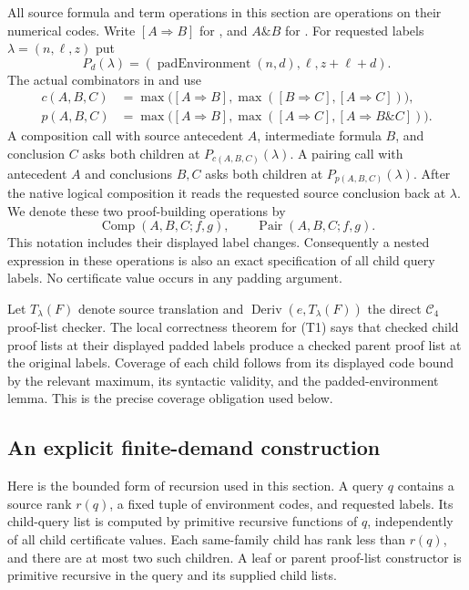 All source formula and term operations in this section are operations on
their numerical codes.  Write $[A\Rightarrow B]$ for
, and $A\mathbin{\&}B$ for .
For requested labels $\lambda=(n,\ell,z)$ put
\[
 P_d(\lambda)=
 (\operatorname{padEnvironment}(n,d),\ell,z+\ell+d).
\]
The actual combinators in
 and
 use
\begin{align*}
 c(A,B,C)&=\max\bigl([A\Rightarrow B],
               \max([B\Rightarrow C],[A\Rightarrow C])\bigr),\\
 p(A,B,C)&=\max\bigl([A\Rightarrow B],
               \max([A\Rightarrow C],[A\Rightarrow B\mathbin{\&}C])\bigr).
\end{align*}
A composition call with source antecedent $A$, intermediate formula $B$,
and conclusion $C$ asks both children at $P_{c(A,B,C)}(\lambda)$.
A pairing call with antecedent $A$ and conclusions $B,C$ asks both
children at $P_{p(A,B,C)}(\lambda)$.  After the native logical
composition it reads the requested source conclusion back at $\lambda$.
We denote these two proof-building operations by
\[
 \operatorname{Comp}(A,B,C;f,g),\qquad
 \operatorname{Pair}(A,B,C;f,g).
 \tag{T1}
\]
This notation includes their displayed label changes.  Consequently a
nested expression in these operations is also an exact specification of
all child query labels.  No certificate value occurs in any padding
argument.

Let $T_\lambda(F)$ denote source translation and
$\operatorname{Deriv}(e,T_\lambda(F))$ the direct $\mathcal C_4$
proof-list checker.  The local correctness theorem for (T1) says that
checked child proof lists at their displayed padded labels produce a
checked parent proof list at the original labels.  Coverage of each
child follows from its displayed code bound by the relevant maximum,
its syntactic validity, and the padded-environment lemma.  This is the
precise coverage obligation used below.

\subsection{An explicit finite-demand construction}

Here is the bounded form of recursion used in this section.  A query
$q$ contains a source rank $r(q)$, a fixed tuple of environment codes,
and requested labels.  Its child-query list is computed by primitive
recursive functions of $q$, independently of all child certificate
values.  Each same-family child has rank less than $r(q)$, and there
are at most two such children.  A leaf or parent proof-list constructor
is primitive recursive in the query and its supplied child lists.

